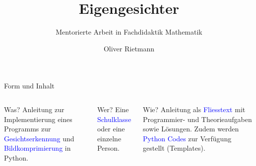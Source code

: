 \documentclass[10pt,aspectratio=169]{beamer}
\title{Eigengesichter}
\subtitle{Mentorierte Arbeit in Fachdidaktik Mathematik}
\date{}
\author{Oliver Rietmann}
\institute{ETH Zürich}
\begin{document}
	
\maketitle


\begin{frame}[fragile]{Form und Inhalt} 	
	\begin{columns}[T,onlytextwidth]
		\column{\textwidth}
		\begin{block}{Was?}
			Anleitung zur Implementierung eines Programms zur \textcolor{blue}{Gesichtserkennung} und \textcolor{blue}{Bildkomprimierung} in Python.
		\end{block}
		\vspace{0.2cm}
		\begin{block}{Wer?}
			Eine \textcolor{blue}{Schulklasse} oder eine einzelne Person.
		\end{block}
		\vspace{0.2cm}
		\begin{block}{Wie?}
			Anleitung als \textcolor{blue}{Fliesstext} mit Programmier- und Theorieaufgaben sowie Lösungen.
			Zudem werden \textcolor{blue}{Python Codes} zur Verfügung gestellt (Templates).
		\end{block}
	\end{columns}	
\end{frame}
\end{document}
